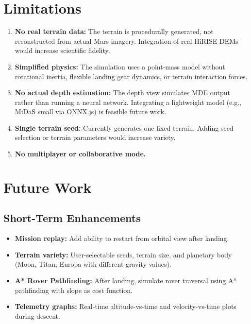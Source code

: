 \section{Limitations}
\begin{enumerate}
    \item \textbf{No real terrain data:} The terrain is procedurally generated, not reconstructed from actual Mars imagery. Integration of real HiRISE DEMs \cite{nasadem} would increase scientific fidelity.
    \item \textbf{Simplified physics:} The simulation uses a point-mass model without rotational inertia, flexible landing gear dynamics, or terrain interaction forces.
    \item \textbf{No actual depth estimation:} The depth view simulates MDE output rather than running a neural network. Integrating a lightweight model (e.g., MiDaS small via ONNX.js) is feasible future work.
    \item \textbf{Single terrain seed:} Currently generates one fixed terrain. Adding seed selection or terrain parameters would increase variety.
    \item \textbf{No multiplayer or collaborative mode.}
\end{enumerate}

\section{Future Work}

\subsection{Short-Term Enhancements}
\begin{itemize}
    \item \textbf{Mission replay:} Add ability to restart from orbital view after landing.
    \item \textbf{Terrain variety:} User-selectable seeds, terrain size, and planetary body (Moon, Titan, Europa with different gravity values).
    \item \textbf{A* Rover Pathfinding:} After landing, simulate rover traversal using A* pathfinding \cite{hart1968astar} with slope as cost function.
    \item \textbf{Telemetry graphs:} Real-time altitude-vs-time and velocity-vs-time plots during descent.
\end{itemize}

